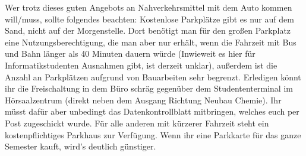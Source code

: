 Wer trotz dieses guten Angebots an Nahverkehrsmittel mit dem Auto kommen will/muss,
  sollte folgendes beachten: Kostenlose Parkplätze gibt es nur auf dem Sand,
  nicht auf der Morgenstelle.  Dort benötigt man für den großen Parkplatz eine Nutzungsberechtigung, die man aber nur erhält,
  wenn die Fahrzeit mit Bus und Bahn länger als 40 Minuten dauern würde (Inwieweit es hier für Informatikstudenten Ausnahmen
  gibt, ist derzeit unklar), außerdem ist die Anzahl an Parkplätzen aufgrund von Bauarbeiten sehr begrenzt.
  Erledigen könnt ihr die Freischaltung in dem Büro
  schräg gegenüber dem Studententerminal im Hörsaalzentrum (direkt neben dem Ausgang Richtung Neubau Chemie).
  Ihr müsst dafür aber unbedingt das Datenkontrollblatt mitbringen,
  welches euch per Post zugeschickt wurde.
  Für alle anderen mit kürzerer Fahrzeit steht ein
  kostenpflichtiges Parkhaus zur Verfügung. Wenn ihr eine Parkkarte für das
  ganze Semester kauft, wird's deutlich günstiger.
  \vspace*{3cm}
 